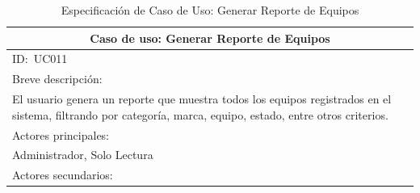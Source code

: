 \documentclass[stu, 12pt, letterpaper, donotrepeattitle, floatsintext, natbib]{apa7}
\begin{document}
\begin{longtable}{@{} p{16.5cm} @{}}
    \caption{Especificación de Caso de Uso: Generar Reporte de Equipos}\label{tab:UC011}                                                                                                                                                                                       \\ \toprule
    \multicolumn{1}{c}{Caso de uso: Generar Reporte de Equipos}                                                                                                                                                                                                                \\ \midrule
    ID:~UC011                                                                                                                                                                                                                                                                  \\ \midrule
    Breve descripción:                                                                                                                                                                                                                                                         \\
    El usuario genera un reporte que muestra todos los equipos registrados en el sistema, filtrando por categoría, marca, equipo, estado, entre otros criterios.                                                                                                               \\ \midrule
    Actores principales:                                                                                                                                                                                                                                                       \\
    Administrador, Solo Lectura                                                                                                                                                                                                                                                \\ \midrule
    Actores secundarios:                                                                                                                                                                                                                                                       \\

\end{longtable}
\end{document}
